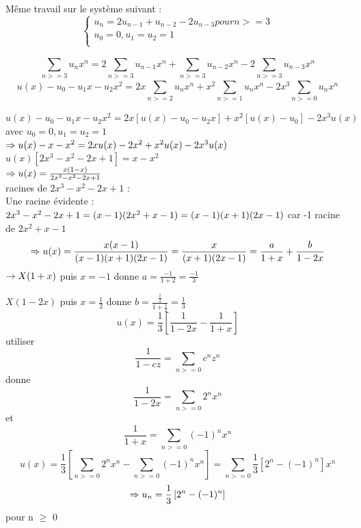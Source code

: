 \begin{exercice}
Même travail sur le système suivant :
\[\begin{cases}
	u_n = 2u_{n-1} + u_{n-2} - 2u_{n-3} pour n>=3\\
	u_0 = 0, u_1 = u_2 = 1\\
\end{cases}\]

\[\sum_{n>=3}^{}u_nx^n = 2\sum_{n>=3}^{}u_{n-1}x^n + \sum_{n>=3}^{}u_{n-2}x^n - 2\sum_{n>=3}^{}u_{n-3}x^n\]
\[u(x)-u_0-u_{1}x-u_{2}x^2 = 2x\sum_{n>=2}^{}u_nx^n+x^2\sum_{n>=1}^{}u_nx^n-2x^3\sum_{n>=0}^{}u_nx^n\]


$u(x)-u_0 -u_1x - u_2x^2 = 2x [u(x)-u_0-u_2x] + x^2[u(x) - u_0] - 2x^3u(x)$\\
avec $u_0 = 0, u_1 = u_2 = 1$\\

$\Rightarrow u(x) - x - x^2 = 2x u(x) - 2x^2 +x^2u(x) - 2x^3u(x)$\\

$u(x)[2x^3-x^2-2x+1] = x-x^2$\\

$\Rightarrow u(x) = \frac{x(1-x)}{2x^3 - x^2 -2x +1}$\\

racines de $2x^3 -x^2 -2x +1$ :\\
Une racine évidente :\\
$2x^3 - x^2 - 2x + 1 = (x-1)(2x^2+x-1) \\= (x-1)(x+1)(2x-1)$ car -1 racine de $2x^2+x-1$\\



\[\Rightarrow u(x) = \frac{x(x-1)}{(x-1)(x+1)(2x-1)}=\frac{x}{(x+1)(2x-1)}=\frac{a}{1+x}+\frac{b}{1-2x}\]
$\rightarrow X(1+x)$ puis $x=-1$ donne $a=\frac{-1}{1+2}=\frac{-1}{3}$

$X(1-2x)$ puis $x=\frac{1}{2}$ donne $b=\frac{\frac{1}{2}}{1+\frac{1}{2}}=\frac{1}{3}$
\[u(x) = \frac{1}{3}\left[\frac{1}{1-2x}-\frac{1}{1+x}\right]\]
utiliser 
\[\frac{1}{1-cz}=\sum_{n>=0}^{} c^{n}z^{n}\]
donne  \[\frac{1}{1-2x}=\sum_{n>=0}^{} 2^{n}x^{n}\]
et \[\frac{1}{1+x}=\sum_{n>=0}^{} (-1)^{n}x^{n}\]
\[u(x) = \frac{1}{3}\left[\sum_{n>=0}^{} 2^{n}x^{n}-\sum_{n>=0}^{} (-1)^{n}x^{n}\right]=\sum_{n>=0}^{} \frac{1}{3}\left[2^n-(-1)^n\right]x^n\]
\[\Rightarrow u_n=\frac{1}{3}\left[2^n-(-1)^n\right]\]pour n $\ge$ 0
\end{exercice}
